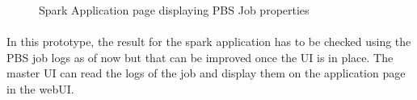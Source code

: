 \begin{figure}[h]
    \centering
    \caption{Spark Application page displaying PBS Job properties}
\end{figure}

\paragraph{}
In this prototype, the result for the \gls{spark} application has to be checked
using the PBS job logs as of now but that can be improved once the UI is in
place. The master UI can read the logs of the job and display them on the
application page in the webUI.

